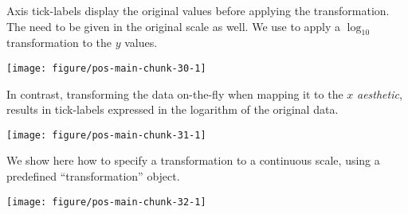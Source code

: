 \documentclass[krantz2]{krantz}\usepackage{knitr}%
\begin{document}
Axis tick-labels display the original values before applying the transformation. The  need to be given in the original scale as well. We use  to apply a $\log_{10}$ transformation to the $y$ values.

\begin{knitrout}\footnotesize
{}\color{fgcolor}\begin{kframe}
\begin{alltt}
  \hlopt{+}
  \hlstd{()} \hlopt{+}
  \hlstd{(}\hlstd{=}\hlstd{(}\hlstd{,}\hlstd{,}\hlstd{,}\hlstd{))}
\end{alltt}
\end{kframe}

{\centering \texttt{[image: figure/pos-main-chunk-30-1]} 

}



\end{knitrout}

In contrast, transforming the data on-the-fly when mapping it to the $x$ \emph{aesthetic}, results in tick-labels expressed in the logarithm of the original data.

\begin{knitrout}\footnotesize
{}\color{fgcolor}\begin{kframe}
\begin{alltt}
   \hlopt{+} \hlstd{()}
\end{alltt}
\end{kframe}

{\centering \texttt{[image: figure/pos-main-chunk-31-1]} 

}



\end{knitrout}

We show here how to specify a transformation to a continuous scale, using a predefined ``transformation'' object.

\begin{knitrout}\footnotesize
{}\color{fgcolor}\begin{kframe}
\begin{alltt}
  \hlopt{+} \hlstd{()} \hlopt{+}
  \hlstd{(} \hlstd{=} \hlstd{)}
\end{alltt}
\end{kframe}

{\centering \texttt{[image: figure/pos-main-chunk-32-1]} 

}



\end{knitrout}
\end{document}
